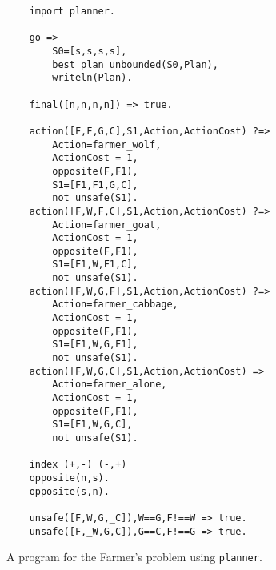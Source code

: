 \begin{figure}
\begin{center}
\begin{verbatim}
    import planner.

    go =>
        S0=[s,s,s,s],
        best_plan_unbounded(S0,Plan),
        writeln(Plan).

    final([n,n,n,n]) => true.

    action([F,F,G,C],S1,Action,ActionCost) ?=>
        Action=farmer_wolf,
        ActionCost = 1,        
        opposite(F,F1),
        S1=[F1,F1,G,C],
        not unsafe(S1).
    action([F,W,F,C],S1,Action,ActionCost) ?=>
        Action=farmer_goat,
        ActionCost = 1,        
        opposite(F,F1),
        S1=[F1,W,F1,C],
        not unsafe(S1).
    action([F,W,G,F],S1,Action,ActionCost) ?=>
        Action=farmer_cabbage,
        ActionCost = 1,        
        opposite(F,F1),
        S1=[F1,W,G,F1],
        not unsafe(S1).
    action([F,W,G,C],S1,Action,ActionCost) =>
        Action=farmer_alone,
        ActionCost = 1,        
        opposite(F,F1),
        S1=[F1,W,G,C],
        not unsafe(S1).

    index (+,-) (-,+)
    opposite(n,s).
    opposite(s,n).

    unsafe([F,W,G,_C]),W==G,F!==W => true.
    unsafe([F,_W,G,C]),G==C,F!==G => true.
\end{verbatim}
\end{center}
\caption{\label{fig:farmer2}A program for the Farmer's problem using \texttt{planner}.}
\end{figure}


